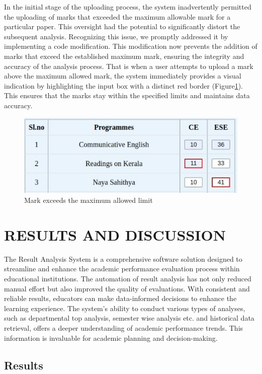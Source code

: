 \documentclass{nascproject}
\begin{document}
In the initial stage of the uploading process, the system inadvertently permitted the uploading of marks that exceeded the maximum allowable mark for a particular paper. This oversight had the potential to significantly distort the subsequent analysis. Recognizing this issue, we promptly addressed it by implementing a code modification. This modification now prevents the addition of marks that exceed the established maximum mark, ensuring the integrity and accuracy of the analysis process. That is when a user attempts to upload a mark above the maximum allowed mark, the system immediately provides a visual indication by highlighting the input box with a distinct red border (Figure\ref{testing}). This ensures that the marks stay within the specified limits and maintains data accuracy.
\begin{figure}
	\centering
	\includegraphics[width=1\linewidth]{testing.jpeg}
	\caption{Mark exceeds the maximum allowed limit}
	\label{testing}
\end{figure}
\chapter{RESULTS AND DISCUSSION}
The Result Analysis System is a comprehensive software solution designed to streamline and enhance the academic performance evaluation process within educational institutions. The automation of result analysis has not only reduced manual effort but also improved the quality of evaluations. With consistent and reliable results, educators can make data-informed decisions to enhance the learning experience. The system's ability to conduct various types of analyses, such as departmental top analysis, semester wise analysis etc. and historical data retrieval, offers a deeper understanding of academic performance trends. This information is invaluable for academic planning and decision-making.
\section{Results}
\end{document}
